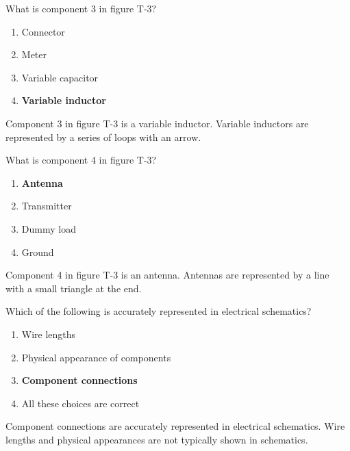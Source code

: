 \begin{tcolorbox}[colback=gray!10!white,colframe=black!75!black,title={T6C10}]
    What is component 3 in figure T-3?
    \begin{enumerate}[label=\Alph*),noitemsep]
        \item Connector
        \item Meter
        \item Variable capacitor
        \item \textbf{Variable inductor}
    \end{enumerate}
\end{tcolorbox}
Component 3 in figure T-3 is a variable inductor. Variable inductors are represented by a series of loops with an arrow.

\begin{tcolorbox}[colback=gray!10!white,colframe=black!75!black,title={T6C11}]
    What is component 4 in figure T-3?
    \begin{enumerate}[label=\Alph*),noitemsep]
        \item \textbf{Antenna}
        \item Transmitter
        \item Dummy load
        \item Ground
    \end{enumerate}
\end{tcolorbox}
Component 4 in figure T-3 is an antenna. Antennas are represented by a line with a small triangle at the end.

\begin{tcolorbox}[colback=gray!10!white,colframe=black!75!black,title={T6C12}]
    Which of the following is accurately represented in electrical schematics?
    \begin{enumerate}[label=\Alph*),noitemsep]
        \item Wire lengths
        \item Physical appearance of components
        \item \textbf{Component connections}
        \item All these choices are correct
    \end{enumerate}
\end{tcolorbox}
Component connections are accurately represented in electrical schematics. Wire lengths and physical appearances are not typically shown in schematics.
